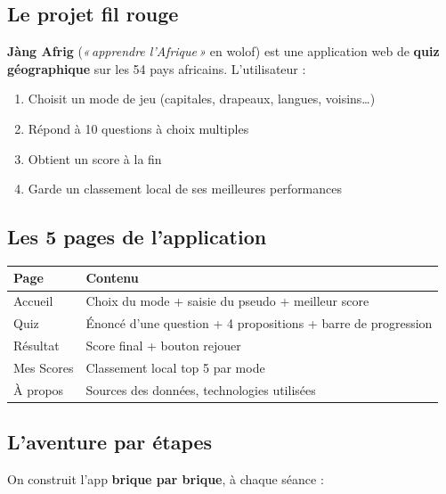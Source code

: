 \documentclass[11pt,a4paper]{article}
\begin{document}
\subsection{Le projet fil rouge}

\textbf{Jàng Afrig} (\textit{«\,apprendre l'Afrique\,»} en wolof) est une
application web de \textbf{quiz géographique} sur les 54 pays africains.
L'utilisateur :

\begin{enumerate}[nosep]
    \item Choisit un mode de jeu (capitales, drapeaux, langues, voisins\ldots)
    \item Répond à 10 questions à choix multiples
    \item Obtient un score à la fin
    \item Garde un classement local de ses meilleures performances
\end{enumerate}

\subsection{Les 5 pages de l'application}

\begin{center}
\begin{tabular}{@{}lp{9cm}@{}}
\toprule
\textbf{Page} & \textbf{Contenu} \\
\midrule
Accueil      & Choix du mode + saisie du pseudo + meilleur score \\
Quiz         & Énoncé d'une question + 4 propositions + barre de progression \\
Résultat     & Score final + bouton rejouer \\
Mes Scores   & Classement local top 5 par mode \\
À propos     & Sources des données, technologies utilisées \\
\bottomrule
\end{tabular}
\end{center}

\subsection{L'aventure par étapes}

On construit l'app \textbf{brique par brique}, à chaque séance :
\end{document}
